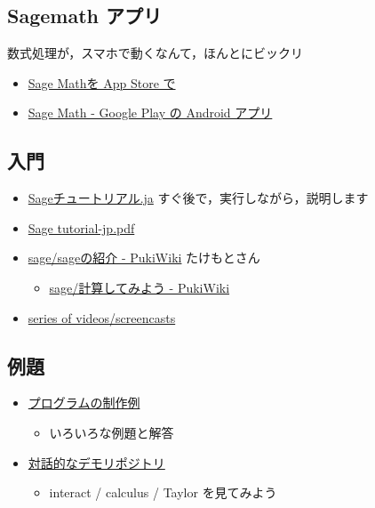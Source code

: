 \documentclass[dvipdfmx,11pt]{jarticle}
\begin{document}
\subsection{Sagemath アプリ}
\label{sec:org577b5e6}

数式処理が，スマホで動くなんて，ほんとにビックリ

\begin{itemize}
\item \href{https://itunes.apple.com/jp/app/sage-math/id496492945?mt=8}{Sage Mathを App Store で}

\item \href{https://play.google.com/store/apps/details?id=org.sagemath.droid\&hl=ja}{Sage Math - Google Play の Android アプリ}
\end{itemize}

\subsection{入門}
\label{sec:orgc814332}

\begin{itemize}
\item \href{http://doc.sagemath.org/html/ja/tutorial/index.html}{Sageチュートリアル.ja} すぐ後で，実行しながら，説明します

\item \href{http://doc.sagemath.org/pdf/ja/tutorial/tutorial-jp.pdf}{Sage tutorial-jp.pdf}

\item \href{http://www.pwv.co.jp/\%7Etake/TakeWiki/index.php?sage\%2Fsage\%E3\%81\%AE\%E7\%B4\%B9\%E4\%BB\%8B}{sage/sageの紹介 - PukiWiki} たけもとさん

\begin{itemize}
\item \href{http://www.pwv.co.jp/\~take/TakeWiki/index.php?sage\%2F\%E8\%A8\%88\%E7\%AE\%97\%E3\%81\%97\%E3\%81\%A6\%E3\%81\%BF\%E3\%82\%88\%E3\%81\%86}{sage/計算してみよう - PukiWiki}
\end{itemize}

\item \href{http://www.sagemath.org/help-video.html}{series of videos/screencasts}
\end{itemize}

\subsection{例題}
\label{sec:org24e5634}

\begin{itemize}
\item \href{http://doc.sagemath.org/html/en/constructions/index.html}{プログラムの制作例}
\begin{itemize}
\item いろいろな例題と解答
\end{itemize}

\item \href{https://wiki.sagemath.org/interact}{対話的なデモリポジトリ} 
\begin{itemize}
\item interact / calculus / Taylor  を見てみよう
\end{itemize}
\end{itemize}
\end{document}
